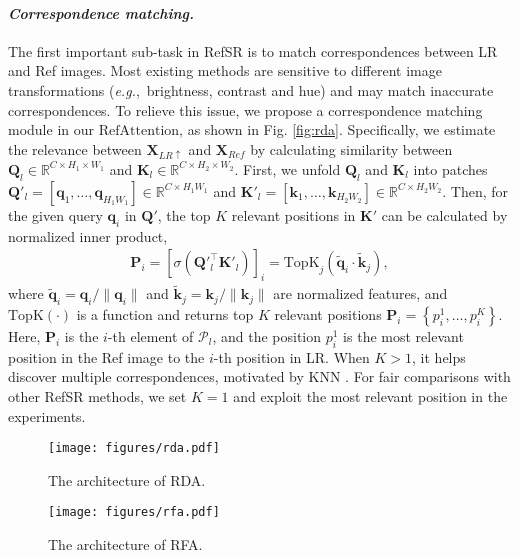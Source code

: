 \documentclass[runningheads]{llncs}
\def\eg{\mbox{\textit{e.g.}, }}
\def\mP{{\mathcal P}}
\def\bK{{\bm{K}}}
\def\bP{{\bm{P}}}
\def\bQ{{\bm{Q}}}
\def\bX{{\bm{X}}}
\def\bk{{\bm k}}
\def\bq{{\bm q}}
\def\mmR{{\mathbb R}}
\def\Attention{{\mathrm{Attention}}}
\def\TopK{{\mathrm{TopK}}}
\def\Ref{{\mathrm{Ref}}}
\begin{document}
\paragraph{\textbf{\emph{Correspondence matching.}}}
The first important sub-task in RefSR is to match correspondences between LR and Ref images.
Most existing methods \cite{zhang2019image,yang2020learning} are sensitive to different image transformations (\eg brightness, contrast and hue) and may match inaccurate correspondences.
To relieve this issue, we propose a correspondence matching module in our $\Ref\Attention$, as shown in Fig. \ref{fig:rda}.
Specifically, we estimate the relevance between $\bX_{LR\uparrow}$ and $\bX_{Ref}$ by calculating similarity between $\bQ_l \in \mmR^{C{\times} H_1{\times}W_1}$ and $\bK_l \in \mmR^{C{\times} H_2{\times}W_2}$.
First, we unfold $\bQ_l$ and $\bK_l$ into patches $\bQ'_l=[\bq_1, \ldots, \bq_{H_1 W_1}]{\in}\mmR^{C {\times} H_1 W_1}$ and $\bK'_l =[\bk_1, \ldots, \bk_{H_2 W_2}] {\in} \mmR^{C {\times} H_2 W_2}$.
Then, for the given query $\bq_i$ in $\bQ'$, the top $K$ relevant positions in $\bK'$ can be calculated by normalized inner product, 
\begin{align}\label{eqn:topK}
    \bP_i = \left[ \sigma \left( \bQ'^{\top}_l \bK'_l \right) \right]_{i} = \TopK_j \left( \widetilde{\bq}_i \cdot \widetilde{\bk}_j \right), 
\end{align}
where $\widetilde{\bq}_i={\bq_i}/{\|\bq_i\|}$ and $\widetilde{\bk}_j={\bk_j}/{\|\bk_j\|}$ are normalized features, and $\TopK(\cdot)$ is a function and returns top $K$ relevant positions $\bP_i{=}\left\{p_i^1, \ldots, p_i^K\right\}$. 
Here, $\bP_i$ is the $i$-th element of $\mP_l$, and the position $p_i^1$ is the most relevant position in the Ref image to the $i$-th position in LR.
When $K>1$, it helps discover multiple correspondences, motivated by KNN \cite{Liu_2015_CVPR}.
For fair comparisons with other RefSR methods, we set $K=1$ and exploit the most relevant position in the experiments.


\begin{figure}[t]
\centering
\begin{minipage}[t]{0.51\textwidth}
\centering
\texttt{[image: figures/rda.pdf]}
\caption{The architecture of RDA.}
\label{fig:rda}
\end{minipage}
\begin{minipage}[t]{0.44\textwidth}
\centering
\texttt{[image: figures/rfa.pdf]}
\caption{The architecture of RFA.}
\label{fig:rfa}
\end{minipage}
\end{figure}
\end{document}
